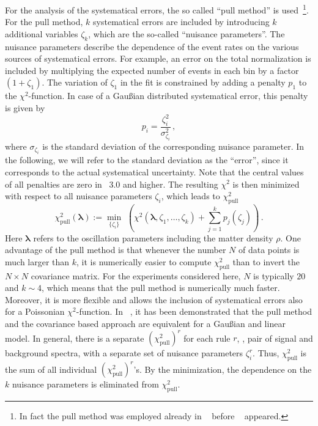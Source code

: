 For the analysis of the systematical errors, the so called 
 ``pull method'' is used~\cite{Fogli:2002pt}\footnote{In fact the pull 
method was employed already in \Ref~\cite{Huber:2002mx} before 
\Ref~\cite{Fogli:2002pt} appeared.}. 
For the pull method, $k$ systematical errors are included by introducing 
$k$ additional variables $\zeta_k$, which are the 
so-called ``nuisance parameters''. 
The nuisance parameters describe the dependence 
of the event rates on the various sources of systematical errors. 
For example, an error on the total 
normalization is included by multiplying the expected number of events in 
each bin by a factor $(1+\zeta_1)$. The variation of $\zeta_1$ in the fit is
constrained by adding a penalty $p_1$ to the $\chi^2$-function. In case 
of a  Gau\ss ian distributed systematical error, this penalty is 
given by
\begin{equation}
\label{eq:penalty}
p_i=\frac{\zeta_i^2}{\sigma_{\zeta_i}^2}\,,
\end{equation}
where $\sigma_{\zeta_i}$ is the standard 
deviation of the corresponding nuisance parameter. In the following,
we will refer to the  standard deviation as
the ``error'', since it corresponds to the actual systematical uncertainty.
Note that the central values of all penalties are zero in \GLOBES\ 3.0 and higher. 
The resulting $\chi^2$ is then minimized with respect to all nuisance 
parameters $\zeta_i$, which leads to $\chi^2_\mathrm{pull}$
\begin{equation}
\chi^2_\mathrm{pull}(\boldsymbol{\lambda}):=\min_{\{\zeta_i\} } \,\, \left( 
\chi^2(\boldsymbol{\lambda},
\zeta_1, \ldots, \zeta_k)+ \sum_{j=1}^{k} p_j(\zeta_j)\right)\,.
\end{equation}
Here $\boldsymbol{\lambda}$ refers to the oscillation parameters 
including the matter density
$\rho$. One advantage of the pull method is that whenever the number $N$ of 
data points is much larger than $k$, it is numerically easier to compute 
$\chi^2_\mathrm{pull}$ than to invert the $N\times N$ covariance matrix. For
the experiments considered here, $N$ is typically $20$ and $k\sim 4$, 
which means that the pull method is numerically much faster. Moreover,
 it is more flexible and  allows the inclusion of systematical errors 
also for a Poissonian $\chi^2$-function.
In \Ref~\cite{Fogli:2002pt}, it has been demonstrated that the pull method 
and the covariance based approach are equivalent for a Gau\ss ian and 
linear model. In general,
there is a separate $(\chi^2_\mathrm{pull})^r$ for each rule $r$, 
\ie , pair of signal and background spectra, with a separate set of 
nuisance parameters $\zeta_i^r$. Thus, $\chi^2_\mathrm{pull}$
is the sum of all individual  $(\chi^2_\mathrm{pull})^r$'s.
By the minimization, the dependence on the $k$ nuisance parameters is eliminated  from $\chi^2_\mathrm{pull}$. 

